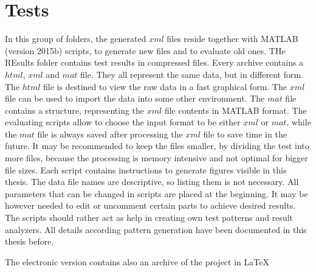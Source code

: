 \section{Tests}
In this group of folders, the generated $xml$ files reside together with MATLAB (version 2015b) scripts, to generate new files and to evaluate old ones. THe REsults folder contains test results in compressed files. Every archive contains a $html$, $xml$ and $mat$ file. They all represent the same data, but in different form. The $html$ file is destined to view the raw data in a fast graphical form. The $xml$ file can be used to import the data into some other environment. The $mat$ file contains a structure, representing the $xml$ file contents in MATLAB format. The evaluating scripts allow to choose the input format to be either $xml$ or $mat$, while the $mat$ file is always saved after processing the $xml$ file to save time in the future. It may be recommended to keep the files smaller, by dividing the test into more files, because the processing is memory intensive and not optimal for bigger file sizes.
Each script contains instructions to generate figures visible in this thesis. The data file names are descriptive, so listing them is not necessary. All parameters that can be changed in scripts are placed at the beginning. It may be however needed to edit or uncomment certain parts to achieve desired results. The scripts should rather act as help in creating own test patterns and result analyzers. All details according pattern generation have been documented in this thesis before.

The electronic version contains also an archive of the project in \LaTeX 
